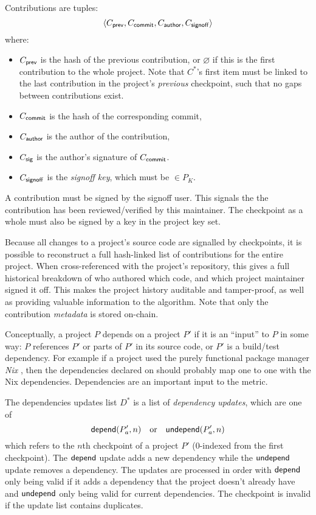 Contributions are tuples:
\[
   \langle C_{\mathsf{prev}}, C_{\mathsf{commit}}, C_{\mathsf{author}}, C_{\mathsf{signoff}}\rangle
\]
where:
\begin{itemize}
\item $C_{\mathsf{prev}}$ is the hash of the previous contribution, or
  $\varnothing$ if this is the first contribution to the whole
  project. Note that $C^*$'s first item must be linked to the last
  contribution in the project's \emph{previous} checkpoint, such that no
  gaps between contributions exist.
\item $C_{\mathsf{commit}}$ is the hash of the corresponding commit,
\item $C_{\mathsf{author}}$ is the author of the contribution,
\item $C_{\mathsf{sig}}$ is the author's signature of $C_{\mathsf{commit}}$.
\item $C_{\mathsf{signoff}}$ is the \emph{signoff key}, which must be $\in P_K$.
\end{itemize}
A contribution must be signed by the signoff user. This signals the
the contribution has been reviewed/verified by this maintainer. The
checkpoint as a whole must also be signed by a key in the project key set.

Because all changes to a project's source code are signalled by checkpoints, it
is possible to reconstruct a full hash-linked list of contributions for the
entire project. When cross-referenced with the project's repository, this gives
a full historical breakdown of who authored which code, and which project
maintainer signed it off.  This makes the project history auditable and
tamper-proof, as well as providing valuable information to the \osrank{}
algorithm. Note that only the contribution \emph{metadata} is stored on-chain.

\label{s:dependencies}
Conceptually, a project $P$ depends on a project $P'$ if it is an
``input'' to $P$ in some way: $P$ references $P'$ or parts of
$P'$ in its source code, or $P'$ is a build/test dependency.
For example if a project used the purely functional package
manager \emph{Nix} \cite{nix}, then the dependencies declared on
\oscoin{} should probably map one to one with the Nix
dependencies. Dependencies are an important input to the \osrank{}
metric.

The dependencies updates list $D^*$ is a list of \emph{dependency
  updates}, which are one of
\[
    \mathsf{depend}(P'_a, n) \quad \text{or} \quad \mathsf{undepend}(P'_a, n)
\]
which refers to the $n$th checkpoint of a project $P'$ ($0$-indexed
from the first checkpoint). The $\mathsf{depend}$ update adds a new dependency
while the $\mathsf{undepend}$ update removes a dependency. The updates are
processed in order with $\mathsf{depend}$ only being valid if it adds a
dependency that the project doesn't already have and $\mathsf{undepend}$
only being valid for current dependencies. The checkpoint is invalid
if the update list contains duplicates.


